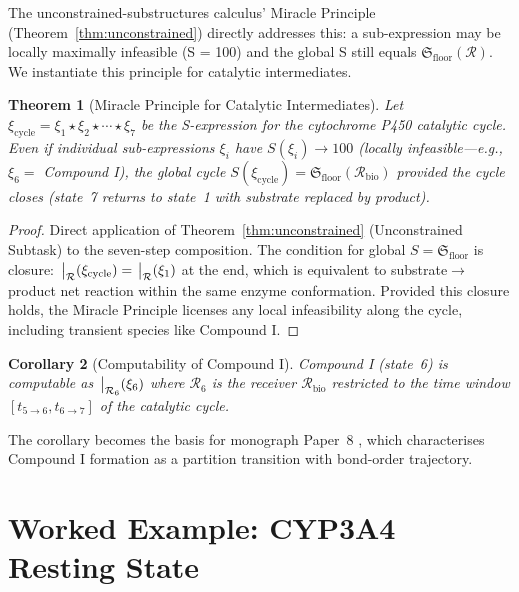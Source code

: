 \documentclass[11pt,twocolumn,a4paper]{article}
\newtheorem{theorem}{Theorem}[section]
\newtheorem{corollary}[theorem]{Corollary}
\theoremstyle{definition}
\theoremstyle{remark}
\newcommand{\Recv}{\mathcal{R}}
\newcommand{\Floor}{{\mathfrak{S}_{\mathrm{floor}}}}
\newcommand{\Sexp}{\xi}
\begin{document}
The unconstrained-substructures calculus' Miracle Principle (Theorem~\ref{thm:unconstrained}) directly addresses this: a sub-expression may be locally maximally infeasible (S = 100) and the global S still equals $\Floor(\Recv)$. We instantiate this principle for catalytic intermediates.

\begin{theorem}[Miracle Principle for Catalytic Intermediates]
\label{thm:miracle_cat}
Let $\Sexp_{\mathrm{cycle}} = \Sexp_1 \star \Sexp_2 \star \cdots \star \Sexp_7$ be the S-expression for the cytochrome P450 catalytic cycle. Even if individual sub-expressions $\Sexp_i$ have $S(\Sexp_i) \to 100$ (locally infeasible---e.g., $\Sexp_6 = $ Compound I), the global cycle $S(\Sexp_{\mathrm{cycle}}) = \Floor(\Recv_{\mathrm{bio}})$ provided the cycle closes (state~7 returns to state~1 with substrate replaced by product).
\end{theorem}

\begin{proof}
Direct application of Theorem~\ref{thm:unconstrained} (Unconstrained Subtask) to the seven-step composition. The condition for global $S = \Floor$ is closure: $\eval_\Recv(\Sexp_{\mathrm{cycle}}) = \eval_\Recv(\Sexp_1)$ at the end, which is equivalent to substrate$\to$product net reaction within the same enzyme conformation. Provided this closure holds, the Miracle Principle licenses any local infeasibility along the cycle, including transient species like Compound I.
\end{proof}

\begin{corollary}[Computability of Compound I]
\label{cor:compound_i}
Compound I (state~6) is computable as $\eval_{\Recv_6}(\Sexp_6)$ where $\Recv_6$ is the receiver $\Recv_{\mathrm{bio}}$ restricted to the time window $[t_{5 \to 6}, t_{6 \to 7}]$ of the catalytic cycle.
\end{corollary}

The corollary becomes the basis for monograph Paper~8 \citep{sachikonye2025_compoundI}, which characterises Compound I formation as a partition transition with bond-order trajectory.

\part{Worked Example: CYP3A4 Resting State}
\end{document}
